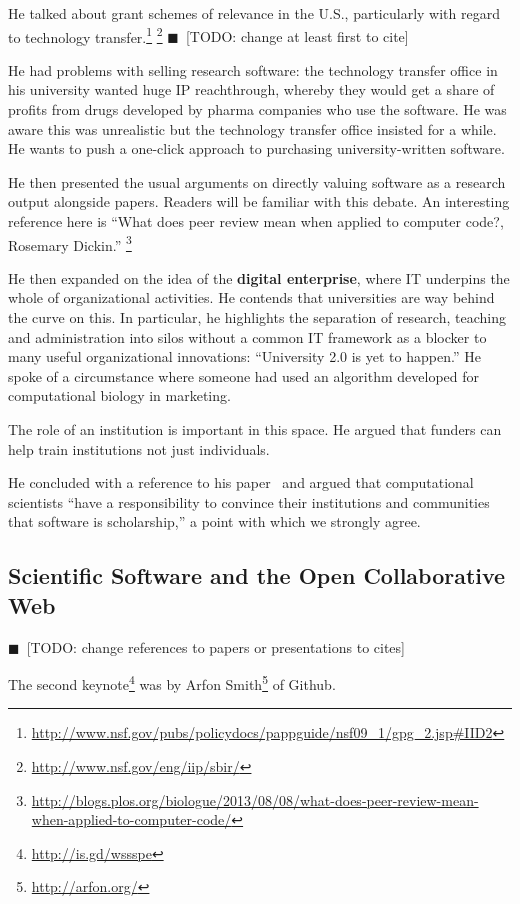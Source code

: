 \documentclass[11pt, oneside]{amsart}
\newcommand{\todo}[1]{{\color{blue}$\blacksquare$~\textsf{[TODO: #1]}}}
\begin{document}
He talked about grant schemes of relevance in the U.S., particularly with regard to technology transfer.\footnote{\url{http://www.nsf.gov/pubs/policydocs/pappguide/nsf09_1/gpg_2.jsp\#IID2}} \footnote{\url{http://www.nsf.gov/eng/iip/sbir/}} \todo{change at least first to cite}

He had problems with selling research software: the technology transfer
office in his university wanted huge IP reachthrough, whereby they would get a
share of profits from drugs developed by pharma companies who use the
software. He was aware this was unrealistic but the technology transfer
office insisted for a
while. He wants to push a one-click approach to purchasing
university-written software. 

He then presented the usual arguments on directly valuing software as a
research output alongside papers. Readers will be familiar with this
debate. An interesting reference here is ``What
does peer review mean when applied to computer code?, Rosemary Dickin.''
\footnote{\url{http://blogs.plos.org/biologue/2013/08/08/what-does-peer-review-mean-when-applied-to-computer-code/}}

He then expanded on the idea of the \textbf{digital enterprise}, where
IT underpins the whole of organizational activities. He contends that
universities are way behind the curve on this. In particular, he
highlights the separation of research, teaching and administration into
silos without a common IT framework as a blocker to many useful
organizational innovations: ``University 2.0 is yet to happen.'' He
spoke of a circumstance where someone had used an algorithm developed
for computational biology in marketing.

The role of an institution is important in this space. He argued that
funders can help train institutions not just individuals.

He concluded with a reference to his paper~\cite{bourne_ten} and argued that computational scientists ``have a
responsibility to convince their institutions and communities that
software is scholarship,'' a point with which we strongly agree.

\subsection{Scientific Software and the Open Collaborative Web}

\todo{change references to papers or presentations to cites}

The second keynote\footnote{\url{http://is.gd/wssspe}} was by
 Arfon Smith\footnote{\url{http://arfon.org/}} of Github.
\end{document}
